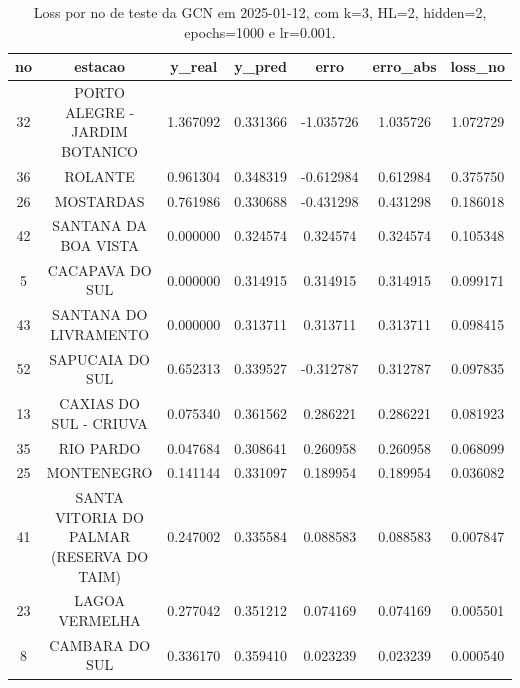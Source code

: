 \begin{table}[h]
\centering
\caption{Loss por no de teste da GCN em 2025-01-12, com k=3, HL=2, hidden=2, epochs=1000 e lr=0.001.}
\label{tab:gcn_loss_k3_hl2_h2_e1000_d20250112}
\begin{tabular}{ccccccc}
\toprule
no & estacao & y\_real & y\_pred & erro & erro\_abs & loss\_no \\
\midrule
32 & PORTO ALEGRE - JARDIM BOTANICO & 1.367092 & 0.331366 & -1.035726 & 1.035726 & 1.072729 \\
36 & ROLANTE & 0.961304 & 0.348319 & -0.612984 & 0.612984 & 0.375750 \\
26 & MOSTARDAS & 0.761986 & 0.330688 & -0.431298 & 0.431298 & 0.186018 \\
42 & SANTANA DA BOA VISTA & 0.000000 & 0.324574 & 0.324574 & 0.324574 & 0.105348 \\
5 & CACAPAVA DO SUL & 0.000000 & 0.314915 & 0.314915 & 0.314915 & 0.099171 \\
43 & SANTANA DO LIVRAMENTO & 0.000000 & 0.313711 & 0.313711 & 0.313711 & 0.098415 \\
52 & SAPUCAIA DO SUL & 0.652313 & 0.339527 & -0.312787 & 0.312787 & 0.097835 \\
13 & CAXIAS DO SUL - CRIUVA & 0.075340 & 0.361562 & 0.286221 & 0.286221 & 0.081923 \\
35 & RIO PARDO & 0.047684 & 0.308641 & 0.260958 & 0.260958 & 0.068099 \\
25 & MONTENEGRO & 0.141144 & 0.331097 & 0.189954 & 0.189954 & 0.036082 \\
41 & SANTA VITORIA DO PALMAR (RESERVA DO TAIM) & 0.247002 & 0.335584 & 0.088583 & 0.088583 & 0.007847 \\
23 & LAGOA VERMELHA & 0.277042 & 0.351212 & 0.074169 & 0.074169 & 0.005501 \\
8 & CAMBARA DO SUL & 0.336170 & 0.359410 & 0.023239 & 0.023239 & 0.000540 \\
\bottomrule
\end{tabular}
\end{table}
